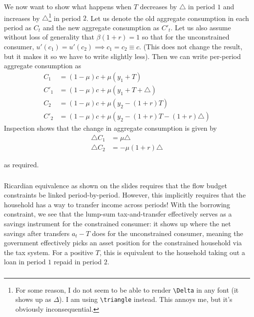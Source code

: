 \documentclass[12pt, letterpaper, parskip = full]{article}
\begin{document}
	We now want to show what happens when \(T\) decreases by \(\triangle\) in period \(1\) and increases by \(\triangle\)\footnote{For some reason, I do not seem to be able to render \Verb"\Delta" in any font (it shows up as \(\Delta\)). I am using \Verb"\triangle" instead. This annoys me, but it's obviously inconsequential.} in period \(2\). Let us denote the old aggregate consumption in each period as \(C_t\) and the new aggregate consumption as \(C'_t\).  Let us also assume without loss of generality that \(\beta (1+r) = 1\) so that for the unconstrained consumer, \(u'(c_1) = u'(c_2) \implies c_1 = c_2 \equiv c\). (This does not change the result, but it makes it so we have to write slightly less). Then we can write per-period aggregate consumption as 
	\begin{align*}
	C_1 &= (1 - \mu) c + \mu (y_1 + T) \\
	C'_1 &= (1 - \mu) c + \mu (y_1 + T + \triangle) \\
	C_2 &= (1 - \mu) c + \mu (y_2 - (1+r) T) \\
	C'_2 &= (1 - \mu) c + \mu (y_2 - (1+r) T - (1+r) \triangle)
	\end{align*}
	Inspection shows that the change in aggregate consumption is given by
	\begin{align*}
	\triangle C_1 &= \mu \triangle \\
	\triangle C_2 &= - \mu (1+r) \triangle
	\end{align*}
	
	as required.

	\subsubsection{}

	Ricardian equivalence as shown on the slides requires that the flow budget constraints be linked period-by-period. However, this implicitly requires that the household has a way to transfer income across periods! With the borrowing constraint, we see that the lump-sum tax-and-transfer effectively serves as a savings instrument for the constrained consumer: it shows up where the net savings after transfers \(a_t - T\) does for the unconstrained consumer, meaning the government effectively picks an asset position for the constrained household via the tax system. For a positive \(T\), this is equivalent to the household taking out a loan in period \(1\) repaid in period \(2\).

	\subsubsection{}
\end{document}
